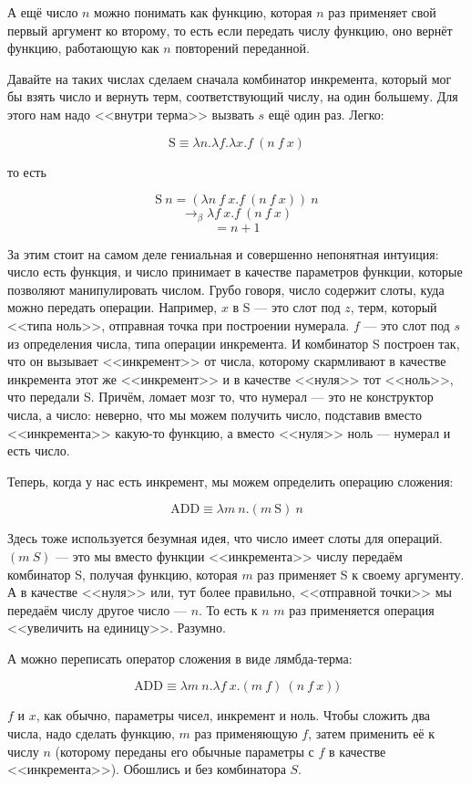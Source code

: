 \documentclass{../../text-style}
\begin{document}
А ещё число $n$ можно понимать как функцию, которая $n$ раз применяет свой первый аргумент ко второму, то есть если передать числу функцию, оно вернёт функцию, работающую как $n$ повторений переданной.

Давайте на таких числах сделаем сначала комбинатор инкремента, который мог бы взять число и вернуть терм, соответствующий числу, на один большему. Для этого нам надо <<внутри терма>> вызвать $s$ ещё один раз. Легко:

$$\mbox{S}\equiv \lambda n.\lambda f.\lambda x.f\ (n\ f\ x)$$

то есть

$$\mbox{S}\ n = (\lambda n\ f\ x.f\ (n\ f\ x))\ n$$
$$\rightarrow_\beta \lambda f\ x.f\ (n\ f\ x)$$
$$= n + 1$$

За этим стоит на самом деле гениальная и совершенно непонятная интуиция: число есть функция, и число принимает в качестве параметров функции, которые позволяют манипулировать числом. Грубо говоря, число содержит слоты, куда можно передать операции. Например, $x$ в S --- это слот под $z$, терм, который <<типа ноль>>, отправная точка при построении нумерала. $f$ --- это слот под $s$ из определения числа, типа операции инкремента. И комбинатор S построен так, что он вызывает <<инкремент>> от числа, которому скармливают в качестве инкремента этот же <<инкремент>> и в качестве <<нуля>> тот <<ноль>>, что передали S. Причём, ломает мозг то, что нумерал --- это не конструктор числа, а число: неверно, что мы можем получить число, подставив вместо <<инкремента>> какую-то функцию, а вместо <<нуля>> ноль --- нумерал и есть число.

Теперь, когда у нас есть инкремент, мы можем определить операцию сложения:

$$\mbox{ADD} \equiv \lambda m\ n.(m\ \mbox{S})\ n$$

Здесь тоже используется безумная идея, что число имеет слоты для операций. $(m\ S)$ --- это мы вместо функции <<инкремента>> числу передаём комбинатор S, получая функцию, которая $m$ раз применяет S к своему аргументу. А в качестве <<нуля>> или, тут более правильно, <<отправной точки>> мы передаём числу другое число --- $n$. То есть к $n$ $m$ раз применяется операция <<увеличить на единицу>>. Разумно.

А можно переписать оператор сложения в виде лямбда-терма:

$$\mbox{ADD} \equiv \lambda m\ n.\lambda f\ x.(m\ f)\ (n\ f\ x))$$

$f$ и $x$, как обычно, параметры чисел, инкремент и ноль. Чтобы сложить два числа, надо сделать функцию, $m$ раз применяющую $f$, затем применить её к числу $n$ (которому переданы его обычные параметры с $f$ в качестве <<инкремента>>). Обошлись и без комбинатора $S$.
\end{document}
